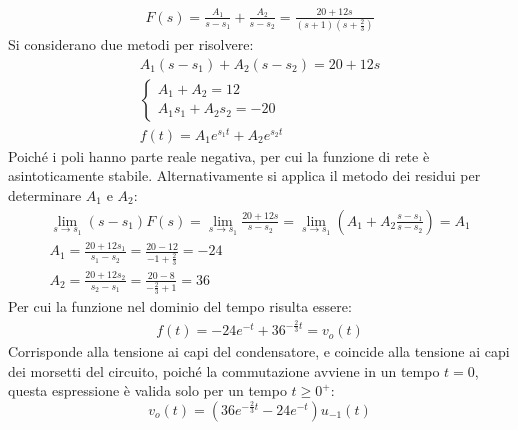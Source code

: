 \documentclass{article}
\begin{document}
\begin{gather*}
    F(s)=\displaystyle\frac{A_1}{s-s_1}+\frac{A_2}{s-s_2}=\frac{20+12s}{(s+1)\left(s+\displaystyle\frac{2}{3}\right)}
\end{gather*}
Si considerano due metodi per risolvere:
\begin{gather*}
    A_1(s-s_1)+A_2(s-s_2)=20+12s\\
    \begin{cases}
        A_1+A_2=12\\
        A_1s_1+A_2s_2=-20
    \end{cases}\\
    f(t)=A_1e^{s_1t}+A_2e^{s_2t}
\end{gather*}
Poiché i poli hanno parte reale negativa, per cui la funzione di rete è asintoticamente stabile. 
Alternativamente si applica il metodo dei residui per determinare $A_1$ e $A_2$:
\begin{gather*}
    \lim_{s\to s_1}(s-s_1)F(s)=\lim_{s\to s_1}\displaystyle\frac{20+12s}{s-s_2}=\lim_{s\to s_1}\left(A_1+A_2\frac{s-s_1}{s-s_2}\right)=A_1\\
    A_1=\displaystyle\frac{20+12s_1}{s_1-s_2}=\frac{20-12}{-1+\displaystyle\frac{2}{3}}=-24\\
    A_2=\displaystyle\frac{20+12s_2}{s_2-s_1}=\frac{20-8}{-\displaystyle\frac{2}{3}+1}=36
\end{gather*}
Per cui la funzione nel dominio del tempo risulta essere:
\begin{gather*}
    f(t)=-24e^{-t}+36^{-\frac{2}{3}t}=v_o(t)
\end{gather*}
Corrisponde alla tensione ai capi del condensatore, e coincide alla tensione ai capi dei morsetti del circuito, poiché la commutazione avviene in un tempo $t=0$, questa 
espressione è valida solo per un tempo $t\geq0^+$:
\begin{equation}
    v_o(t)=(36e^{-\frac{2}{3}t}-24e^{-t})u_{-1}(t)
\end{equation}
\end{document}

